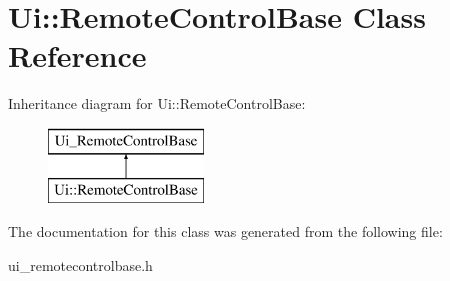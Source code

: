 \hypertarget{classUi_1_1RemoteControlBase}{
\section{Ui::RemoteControlBase Class Reference}
\label{classUi_1_1RemoteControlBase}
}
Inheritance diagram for Ui::RemoteControlBase:\begin{figure}[H]
\begin{center}
\leavevmode
\includegraphics[height=2.000000cm]{classUi_1_1RemoteControlBase}
\end{center}
\end{figure}


The documentation for this class was generated from the following file:\begin{DoxyCompactItemize}
\item 
ui\_\-remotecontrolbase.h\end{DoxyCompactItemize}
